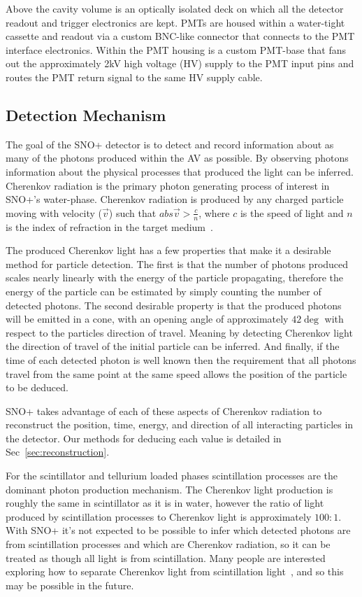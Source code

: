Above the cavity volume is an optically isolated deck on which all the detector
readout and trigger electronics are kept.
PMTs are housed within a water-tight cassette and readout via a custom BNC-like
connector that connects to the PMT interface electronics.
Within the PMT housing is a custom PMT-base that fans out the approximately 2kV
high voltage (HV) supply to the PMT input pins and routes the PMT return signal to the same
HV supply cable.


\subsection{Detection Mechanism}
The goal of the SNO+ detector is to detect and record information about as
many of the photons produced within the AV as possible.
By observing photons information about the physical processes that produced
the light can be inferred.
Cherenkov radiation is the primary photon generating process of interest in
SNO+'s water-phase.
Cherenkov radiation is produced by any charged particle moving with
velocity ($\vec{v}$) such that $abs{\vec{v}} > \frac{c}{n}$, where $c$ is the speed
of light and $n$ is the index of refraction in the target medium~\cite{cherenkov}.

The produced Cherenkov light has a few properties that make it a desirable
method for particle detection.
The first is that the number of photons produced scales nearly linearly
with the energy of the particle propagating, therefore the energy of the particle
can be estimated by simply counting the number of detected photons.
The second desirable property is that the produced photons will be
emitted in a cone, with an opening angle of approximately $42\deg$ with
respect to the particles direction of travel.
Meaning by detecting Cherenkov light the direction of travel of the initial
particle can be inferred.
And finally, if the time of each detected photon is well known then
the requirement that all photons travel from the same point at the same speed
allows the position of the particle to be deduced.

SNO+ takes advantage of each of these aspects of Cherenkov radiation to reconstruct
the position, time, energy, and direction of all interacting particles in the
detector.
Our methods for deducing each value is detailed in Sec~\ref{sec:reconstruction}.

For the scintillator and tellurium loaded phases scintillation processes are
the dominant photon production mechanism.
The Cherenkov light production is roughly the same in scintillator as it is in
water, however the ratio of light produced by scintillation processes to Cherenkov
light is approximately $100:1$.
With SNO+ it's not expected to be possible to infer which detected photons are
from scintillation processes and which are Cherenkov radiation, so it can be treated
as though all light is from scintillation.
Many people are interested exploring how to separate Cherenkov light from scintillation
light~\cite{tanners_paper,javi_chess, winslow_directionality},
and so this may be possible in the future.

